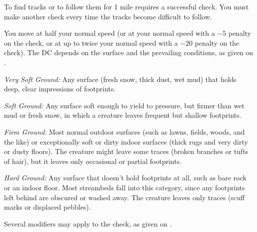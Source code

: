 {}{}
{To find tracks or to follow them for 1 mile requires a successful  check. You must make another  check every time the tracks become difficult to follow.

You move at half your normal speed (or at your normal speed with a $-5$ penalty on the check, or at up to twice your normal speed with a $-20$ penalty on the check). The DC depends on the surface and the prevailing conditions, as given on .



\textit{Very Soft Ground:} Any surface (fresh snow, thick dust, wet mud) that holds deep, clear impressions of footprints.

\textit{Soft Ground:} Any surface soft enough to yield to pressure, but firmer than wet mud or fresh snow, in which a creature leaves frequent but shallow footprints.

\textit{Firm Ground:} Most normal outdoor surfaces (such as lawns, fields, woods, and the like) or exceptionally soft or dirty indoor surfaces (thick rugs and very dirty or dusty floors). The creature might leave some traces (broken branches or tufts of hair), but it leaves only occasional or partial footprints.

\textit{Hard Ground:} Any surface that doesn't hold footprints at all, such as bare rock or an indoor floor. Most streambeds fall into this category, since any footprints left behind are obscured or washed away. The creature leaves only traces (scuff marks or displaced pebbles).

Several modifiers may apply to the  check, as given on .

}
